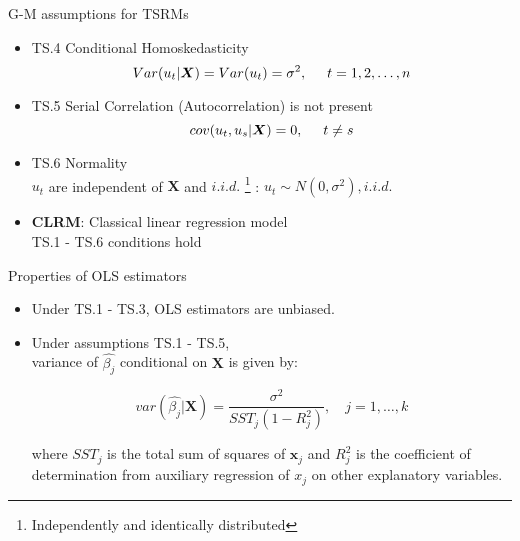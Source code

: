 \documentclass{beamer}
\begin{document}

\begin{frame}{G-M assumptions for TSRMs}
\begin{itemize}
 \item TS.4 Conditional Homoskedasticity 
 $$Var(u_t|\boldsymbol{X})=Var(u_t)=\sigma^2, \hspace{0.5cm} t=1,2,\dots,n$$
 
 \item TS.5 Serial Correlation (Autocorrelation) is not present $$ cov(u_t,u_s|\boldsymbol{X}) = 0, \hspace{0.5cm} t\neq s$$

 \item TS.6 Normality \\
 $u_t$ are independent of $\boldsymbol{X}$ and $\textit{i.i.d.}$
 \footnote{Independently and identically distributed} 
 :  $u_t \sim N(0,\sigma^2), \textit{i.i.d.} $
 
 \vspace{0.6cm}
 
 \item \textbf{CLRM}: Classical linear regression model \\
 TS.1 - TS.6 conditions hold
 
\end{itemize}
\end{frame}


\begin{frame}{Properties of OLS estimators}
\begin{itemize}
\item Under TS.1 - TS.3, OLS estimators are unbiased.
\vspace{0.5cm}
\item Under assumptions TS.1 - TS.5, \\ 
variance of $\hat{\beta_j}$ conditional on $\boldsymbol{X}$ is given by: 

$$\textit{var}(\hat{\beta_j}|\boldsymbol{X}) 
  =\frac{\sigma^2}{\textit{SST}_j(1-R^2_j)}, \quad j=1,\dots,k$$

where $\textit{SST}_j$ is the total sum of squares of $\boldsymbol{x}_{j}$ and $R^2_j$ is the coefficient of determination from auxiliary regression of $x_j$ on other explanatory variables. 
\end{itemize}
\end{frame}
\end{document}
